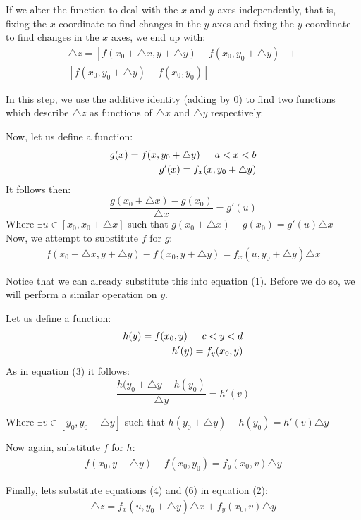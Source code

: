 \documentclass[12pt]{article}
\begin{document}
If we alter the function to deal with the \(x\) and \(y\) axes independently, that is, fixing the \(x\) coordinate to find changes in the \(y\) axes and fixing the \(y\) coordinate to find changes in the \(x\) axes, we end up with:
\begin{align}
	\triangle z = [f(x_0 + \triangle x, y + \triangle y) - f(x_0,y_0 + \triangle y)] + \\ \nonumber[f(x_0,y_0+ \triangle y) - f(x_0,y_0)]
\end{align}

In this step, we use the additive identity (adding by 0) to find two functions which describe \(\triangle z\) as functions of \(\triangle x\) and \(\triangle y\) respectively.

Now, let us define a function:
\begin{align}
	g(x) = f(x,y_0 + \triangle y)\indent a < x < b\\
\nonumber	g'(x) = f_x(x,y_0 + \triangle y)
\end{align}
It follows then:
\[
	\frac{g(x_0 + \triangle x) - g(x_0)}{\triangle x} = g'(u)
\]
Where \(\exists u \in [x_0,x_0+\triangle x]\) such that \(g(x_0 + \triangle x) - g(x_0) = g'(u)\triangle x\)\\
Now, we attempt to substitute \(f\) for \(g\): 
\begin{align}
	f(x_0 + \triangle x, y + \triangle y) - f(x_0, y + \triangle y) = f_x(u, y_0 + \triangle y)\triangle x
\end{align}

Notice that we can already substitute this into equation (1). Before we do so, we will perform a similar operation on \(y\).

Let us define a function:
\begin{align}
	h(y) = f(x_0,y) \indent c < y < d\\
	\nonumber h'(y) = f_y(x_0,y)
\end{align}
As in equation (3) it follows:
\[
	\frac{h(y_0 + \triangle y - h(y_0)}{\triangle y} = h'(v)
\]

Where \(\exists v \in [y_0, y_0 + \triangle y]\) such that \(h(y_0 + \triangle y) - h(y_0) = h'(v)\triangle y\)

Now again, substitute \(f\) for \(h\):
\begin{align}
	f(x_0,y+\triangle y) - f(x_0, y_0) = f_y(x_0,v)\triangle y
\end{align}

Finally, lets substitute equations (4) and (6) in equation (2):
\begin{align}
	\triangle z = f_x(u,y_0 + \triangle y)\triangle x + f_y(x_0,v)\triangle y
\end{align}
\end{document}
